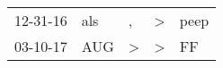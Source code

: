\begin{supertabular}{p{0.07\textwidth}p{0.06\textwidth}p{0.02\textwidth}p{0.02\textwidth}p{0.06\textwidth}}
 12-31-16\textsuperscript{} &  als\textsuperscript{} &             , &  \textgreater &  peep\textsuperscript{} \\
 03-10-17\textsuperscript{} &  AUG\textsuperscript{} &  \textgreater &  \textgreater &    FF\textsuperscript{} \\
\end{supertabular}
